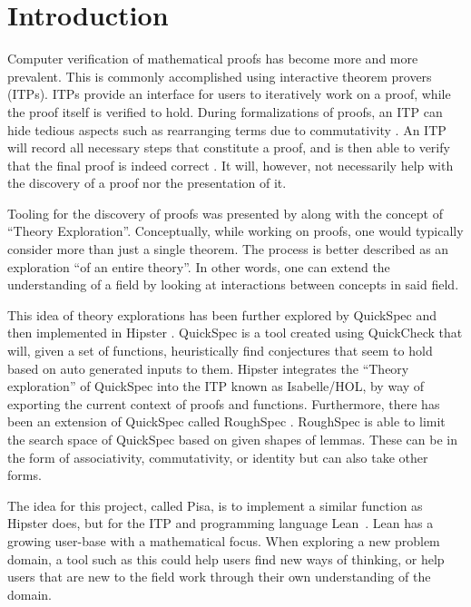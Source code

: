 \chapter{Introduction}\label{sec:introduction}
Computer verification of mathematical proofs has become more and more prevalent.
This is commonly accomplished using interactive theorem provers (ITPs).
ITPs provide an interface for users to iteratively work on a proof, while the proof itself is verified to hold.
During formalizations of proofs, an ITP can hide tedious aspects such as rearranging terms due to commutativity \autocite{MathReasoning}.
An ITP will record all necessary steps that constitute a proof, and is then able to verify that the final proof is indeed correct \autocite{ProofAssistants}.
It will, however, not necessarily help with the discovery of a proof nor the presentation of it.

Tooling for the discovery of proofs was presented by \textcite{TheoryExploration} along with the concept of ``Theory Exploration''.
Conceptually, while working on proofs, one would typically consider more than just a single theorem.
The process is better described as an exploration ``of an entire theory''.
In other words, one can extend the understanding of a field by looking at interactions between concepts in said field.

This idea of theory explorations has been further explored by QuickSpec \autocite{Quickspec} and then implemented in Hipster \autocite{Hipster}.
QuickSpec is a tool created using QuickCheck \autocite{QuickCheck} that will, given a set of functions, heuristically find conjectures that seem to hold based on auto generated inputs to them.
Hipster integrates the ``Theory exploration'' of QuickSpec into the ITP known as Isabelle/HOL, by way of exporting the current context of proofs and functions.
Furthermore, there has been an extension of QuickSpec called RoughSpec \autocite{Roughspec}.
RoughSpec is able to limit the search space of QuickSpec based on given shapes of lemmas.
These can be in the form of associativity, commutativity, or identity but can also take other forms.

The idea for this project, called Pisa, is to implement a similar function as Hipster does, but for the ITP and programming language Lean~\autocite{Lean}.
Lean has a growing user-base with a mathematical focus.
When exploring a new problem domain, a tool such as this could help users find new ways of thinking, or help users that are new to the field work through their own understanding of the domain.

